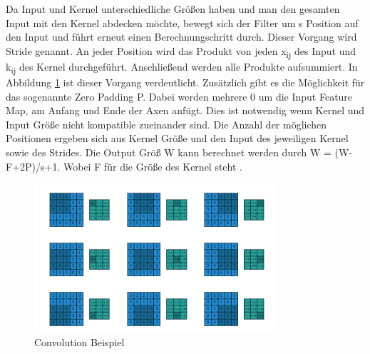 \documentclass{llncs}
\begin{document}
Da Input und Kernel unterschiedliche Größen haben und man den gesamten Input mit den Kernel abdecken möchte, bewegt sich der Filter um s Position auf den Input und führt erneut einen Berechnungschritt durch. Dieser Vorgang wird Stride genannt. An jeder Position wird das Produkt von jeden x\textsubscript{ij} des Input und k\textsubscript{ij} des Kernel durchgeführt.  Anschließend werden alle Produkte aufsummiert. In Abbildung \ref{fig:Bild3} ist dieser Vorgang verdeutlicht. Zusätzlich gibt es die Möglichkeit für das sogenannte Zero Padding P. Dabei werden mehrere 0 um die Input Feature Map, am Anfang und Ende der Axen anfügt. Dies ist notwendig wenn Kernel und Input Größe nicht kompatible zueinander sind. Die Anzahl der möglichen Positionen ergeben sich aus Kernel Größe und den Input des jeweiligen Kernel sowie des Strides. Die Output Größ W kann berechnet werden durch W = (W-F+2P)/s+1. Wobei F für die Größe des Kernel steht \cite{conv}.

\begin{figure}
	\centering
	\includegraphics[width=0.8\textwidth]{conv.png}
	\caption{Convolution Beispiel}
	\label{fig:Bild3}
\end{figure}
\end{document}
